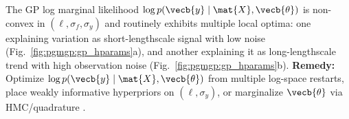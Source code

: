 \documentclass[../../../../master.tex]{subfiles}
\begin{document}
\begin{pitfall}
\label{pit:pgmgp:lml_optima}
The GP log marginal likelihood $\log p(\vecb{y} \mid \mat{X}, \vecb{\theta})$ is non-convex in $(\ell, \sigma_f, \sigma_y)$ and routinely exhibits multiple local optima: one explaining variation as short-lengthscale signal with low noise (Fig.~\ref{fig:pgmgp:gp_hparams}a), and another explaining it as long-lengthscale trend with high observation noise (Fig.~\ref{fig:pgmgp:gp_hparams}b). \textbf{Remedy:} Optimize $\log p(\vecb{y} \mid \mat{X}, \vecb{\theta})$ from multiple log-space restarts, place weakly informative hyperpriors on $(\ell, \sigma_y)$, or marginalize $\vecb{\theta}$ via HMC/quadrature .
\end{pitfall}
\end{document}
